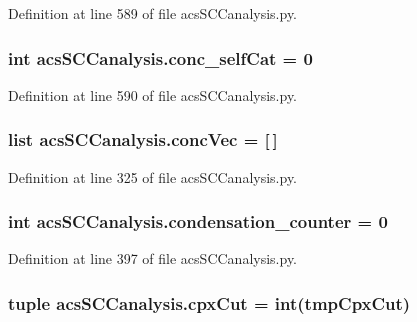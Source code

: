 Definition at line 589 of file acs\-S\-C\-Canalysis.\-py.

\hypertarget{a00097_a9e8cc07f7d7f892f3f72274318dcbcef}{
\subsubsection[{conc\-\_\-self\-Cat}]{\setlength{\rightskip}{0pt plus 5cm}int acs\-S\-C\-Canalysis.\-conc\-\_\-self\-Cat = 0}}\label{a00097_a9e8cc07f7d7f892f3f72274318dcbcef}


Definition at line 590 of file acs\-S\-C\-Canalysis.\-py.

\hypertarget{a00097_a1681853ab5f5859e51f219caa07a8539}{
\subsubsection[{conc\-Vec}]{\setlength{\rightskip}{0pt plus 5cm}list acs\-S\-C\-Canalysis.\-conc\-Vec = \mbox{[}$\,$\mbox{]}}}\label{a00097_a1681853ab5f5859e51f219caa07a8539}


Definition at line 325 of file acs\-S\-C\-Canalysis.\-py.

\hypertarget{a00097_a144441bdbe6e835849cf165ea2946848}{
\subsubsection[{condensation\-\_\-counter}]{\setlength{\rightskip}{0pt plus 5cm}int acs\-S\-C\-Canalysis.\-condensation\-\_\-counter = 0}}\label{a00097_a144441bdbe6e835849cf165ea2946848}


Definition at line 397 of file acs\-S\-C\-Canalysis.\-py.

\hypertarget{a00097_a06673ec4592e44a89a443073b8a29011}{
\subsubsection[{cpx\-Cut}]{\setlength{\rightskip}{0pt plus 5cm}tuple acs\-S\-C\-Canalysis.\-cpx\-Cut = int(tmp\-Cpx\-Cut)}}\label{a00097_a06673ec4592e44a89a443073b8a29011}


